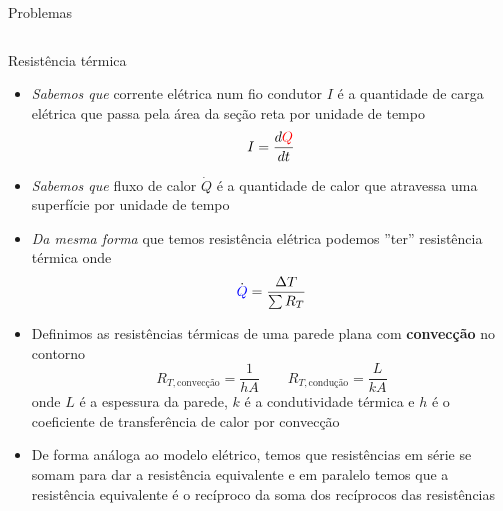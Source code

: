 \documentclass[t,%
brazilian,%
11pt,%
aspectratio=169,%
table%
]{beamer}
\begin{document}
\begin{frame}{Problemas}
\begin{columns}[T]
\begin{column}{0.45\textwidth}
        \end{column}
    \end{columns}
\end{frame}

\begin{frame}{Resistência térmica}
    \begin{itemize}
        \item \textit{Sabemos que} corrente elétrica num fio condutor \(I\) é a quantidade de carga 
            elétrica que passa pela área da seção reta por unidade de tempo
            \[
                I = \frac{d\color{red}Q}{dt}
            \]
        \item \textit{Sabemos que} fluxo de calor \(\dot{Q}\) é a quantidade de calor que atravessa
            uma superfície por unidade de tempo
        \item \textit{Da mesma forma} que temos resistência elétrica podemos ''ter'' 
            resistência térmica onde
            \[
                \dot{\color{blue}Q} = \frac{\Delta T}{\sum R_T}
            \]
        \item Definimos as resistências térmicas de uma parede plana com \textbf{convecção} no
            contorno
            \[
                R_{T,\text{convecção}} = \frac{1}{hA} \quad \quad
                R_{T,\text{condução}} = \frac{L}{kA}
            \]
            onde \(L\) é a espessura da parede, \(k\) é a condutividade térmica e
            \(h\) é o coeficiente de transferência de calor por convecção
    \end{itemize}
\end{frame}

\begin{frame}[c]
    \begin{itemize}
        \item De forma análoga ao modelo elétrico, temos que resistências em
            série se somam para dar a resistência equivalente e em paralelo
            temos que a resistência equivalente é o recíproco da soma dos
            recíprocos das resistências
    \end{itemize}
\end{frame}
\end{document}
